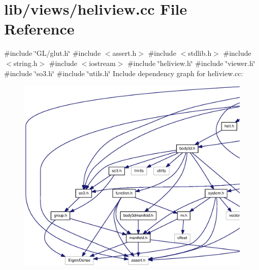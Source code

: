 \section{lib/views/heliview.cc \-File \-Reference}
\label{heliview_8cc}
{\ttfamily \#include \char`\"{}\-G\-L/glut.\-h\char`\"{}}\*
{\ttfamily \#include $<$assert.\-h$>$}\*
{\ttfamily \#include $<$stdlib.\-h$>$}\*
{\ttfamily \#include $<$string.\-h$>$}\*
{\ttfamily \#include $<$iostream$>$}\*
{\ttfamily \#include \char`\"{}heliview.\-h\char`\"{}}\*
{\ttfamily \#include \char`\"{}viewer.\-h\char`\"{}}\*
{\ttfamily \#include \char`\"{}so3.\-h\char`\"{}}\*
{\ttfamily \#include \char`\"{}utils.\-h\char`\"{}}\*
\-Include dependency graph for heliview.\-cc\-:
\nopagebreak
\begin{figure}[H]
\begin{center}
\leavevmode
\includegraphics[width=350pt]{heliview_8cc__incl}
\end{center}
\end{figure}
